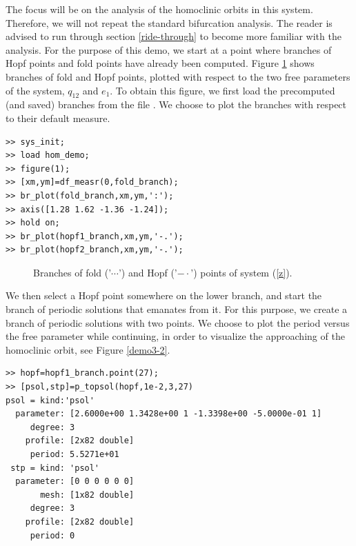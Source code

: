 \documentclass[10pt]{article}
\gdef \file#1{{\bfseries{\ttfamily{#1}}}}
\begin{document}
{The focus will be on the analysis of the homoclinic orbits in 
this system.  Therefore, we will not repeat the standard bifurcation analysis.
The reader is advised to run through section \ref{ride-through} to become more
familiar with the analysis.  For the purpose of this demo,
 we start at a point where branches of Hopf points and fold points have 
already been computed. Figure \ref{demo3-1} shows branches of 
fold and Hopf points, plotted with respect to the two free parameters of the 
system, $q_{12}$ and $e_1$.  To obtain this figure, we first load the 
precomputed (and saved) branches from the file \file{hcl\_demo.mat}.  
We choose to
plot the branches with respect to their default measure.
{\small\begin{verbatim}
>> sys_init;
>> load hom_demo;
>> figure(1);
>> [xm,ym]=df_measr(0,fold_branch);
>> br_plot(fold_branch,xm,ym,':');
>> axis([1.28 1.62 -1.36 -1.24]);
>> hold on;
>> br_plot(hopf1_branch,xm,ym,'-.');
>> br_plot(hopf2_branch,xm,ym,'-.');
\end{verbatim}}
\begin{figure}[ht]
\begin{center}
\caption{\small\label{demo3-1}Branches of fold ('$\cdots$') and 
Hopf ('$-\cdot$') points of system (\ref{z}).}
\end{center}
\end{figure}

We then select a Hopf point somewhere on the lower branch, 
and start the branch of
periodic solutions that emanates from it.  For this purpose, we create a
branch of periodic solutions with two points. We choose to plot the 
period versus the free
parameter while continuing, in order to visualize 
the approaching of the homoclinic orbit, see 
Figure \ref{demo3-2}.
{\small\begin{verbatim}
>> hopf=hopf1_branch.point(27);
>> [psol,stp]=p_topsol(hopf,1e-2,3,27)
psol = kind:'psol'
  parameter: [2.6000e+00 1.3428e+00 1 -1.3398e+00 -5.0000e-01 1]
     degree: 3
    profile: [2x82 double]
     period: 5.5271e+01
 stp = kind: 'psol'
  parameter: [0 0 0 0 0 0]
       mesh: [1x82 double]
     degree: 3
    profile: [2x82 double]
     period: 0


\end{verbatim}}}
\end{document}
